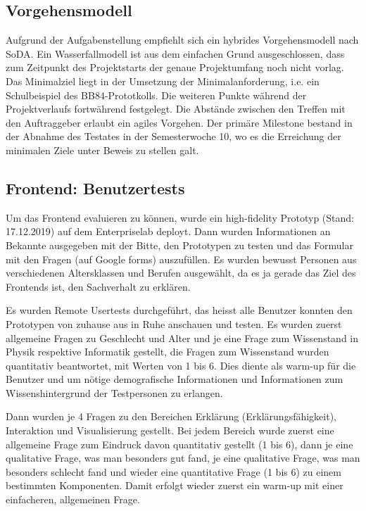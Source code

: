 \documentclass[a4paper,10.2pt,pdftex]{scrartcl}%
\begin{document}
\subsection{Vorgehensmodell}
Aufgrund der Aufgabenstellung empfiehlt sich ein hybrides Vorgehensmodell nach SoDA. Ein Wasserfallmodell ist aus dem einfachen Grund ausgeschlossen, dass zum Zeitpunkt des Projektstarts der genaue Projektumfang noch nicht vorlag. Das Minimalziel liegt in der Umsetzung der Minimalanforderung, i.e. ein Schulbeispiel des BB84-Prototkolls. Die weiteren Punkte während der Projektverlaufs fortwährend festgelegt. Die Abstände zwischen den Treffen mit den Auftraggeber erlaubt ein agiles Vorgehen. Der primäre Milestone bestand in der Abnahme des Testates in der Semesterwoche 10, wo es die Erreichung der minimalen Ziele unter Beweis zu stellen galt.

\subsection{Frontend: Benutzertests}
Um das Frontend evaluieren zu können, wurde ein high-fidelity Prototyp (Stand: 17.12.2019) auf dem Enterpriselab deployt. Dann wurden Informationen an Bekannte ausgegeben mit der Bitte, den Prototypen zu testen und das Formular mit den Fragen (auf Google forms) auszufüllen. Es wurden bewusst Personen aus verschiedenen Altersklassen und Berufen ausgewählt, da es ja gerade das Ziel des Frontends ist, den Sachverhalt zu erklären.

Es wurden Remote Usertests durchgeführt, das heisst alle Benutzer konnten den Prototypen von zuhause aus in Ruhe anschauen und testen. Es wurden zuerst allgemeine Fragen zu Geschlecht und Alter und je eine Frage zum Wissenstand in Physik respektive Informatik gestellt, die Fragen zum Wissenstand wurden quantitativ beantwortet, mit Werten von 1 bis 6. Dies diente als warm-up für die Benutzer und um nötige demografische Informationen und Informationen zum Wissenshintergrund der Testpersonen zu erlangen.

Dann wurden je 4 Fragen zu den Bereichen Erklärung (Erklärungsfähigkeit), Interaktion und Visualisierung gestellt. Bei jedem Bereich wurde zuerst eine allgemeine Frage zum Eindruck davon quantitativ gestellt (1 bis 6), dann je eine qualitative Frage, was man besonders gut fand, je eine qualitative Frage, was man besonders schlecht fand und wieder eine quantitative Frage (1 bis 6) zu einem bestimmten Komponenten. Damit erfolgt wieder zuerst ein warm-up mit einer einfacheren, allgemeinen Frage.
\end{document}

